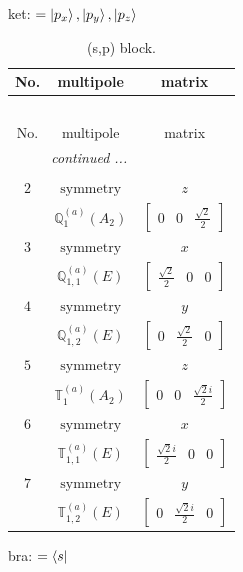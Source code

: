 \documentclass[fleqn,8pt,landscape]{jsarticle}
\begin{document}
\noindent
ket: $=\ket{p_{x}}, \ket{p_{y}}, \ket{p_{z}}$
\renewcommand{\arraystretch}{1.6}
\begin{longtable}{ccc}
\caption{(s,p) block.}
 \\
 \hline \hline
No. & multipole & matrix \\ \hline \endfirsthead

\multicolumn{2}{l}{\tablename\ \thetable{}} \\
 \hline \hline
No. & multipole & matrix \\ \hline \endhead

 \hline \hline
\multicolumn{2}{r}{\footnotesize\it continued ...} \\ \endfoot

 \hline \hline
\multicolumn{2}{r}{} \\ \endlastfoot

$ 2 $ & $ \text{symmetry} $ & $ z $ \\
$  $ & $ \mathbb{Q}_{1}^{(a)}(A_{2}) $ & $ \begin{bmatrix} 0 & 0 & \frac{\sqrt{2}}{2} \end{bmatrix} $ \\ \hline
$ 3 $ & $ \text{symmetry} $ & $ x $ \\
$  $ & $ \mathbb{Q}_{1,1}^{(a)}(E) $ & $ \begin{bmatrix} \frac{\sqrt{2}}{2} & 0 & 0 \end{bmatrix} $ \\ \hline
$ 4 $ & $ \text{symmetry} $ & $ y $ \\
$  $ & $ \mathbb{Q}_{1,2}^{(a)}(E) $ & $ \begin{bmatrix} 0 & \frac{\sqrt{2}}{2} & 0 \end{bmatrix} $ \\ \hline
$ 5 $ & $ \text{symmetry} $ & $ z $ \\
$  $ & $ \mathbb{T}_{1}^{(a)}(A_{2}) $ & $ \begin{bmatrix} 0 & 0 & \frac{\sqrt{2} i}{2} \end{bmatrix} $ \\ \hline
$ 6 $ & $ \text{symmetry} $ & $ x $ \\
$  $ & $ \mathbb{T}_{1,1}^{(a)}(E) $ & $ \begin{bmatrix} \frac{\sqrt{2} i}{2} & 0 & 0 \end{bmatrix} $ \\ \hline
$ 7 $ & $ \text{symmetry} $ & $ y $ \\
$  $ & $ \mathbb{T}_{1,2}^{(a)}(E) $ & $ \begin{bmatrix} 0 & \frac{\sqrt{2} i}{2} & 0 \end{bmatrix} $ \\ \hline
\end{longtable}
bra: $=\bra{s}$
\end{document}
